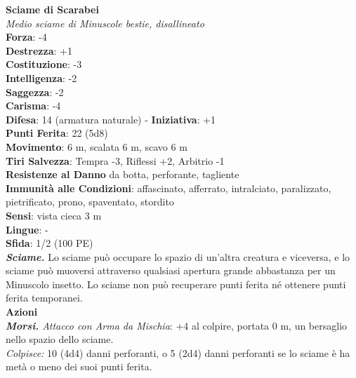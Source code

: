 \begin{multicols}{2}
\medskip\textbf{Sciame di Scarabei}\\
\emph{Medio sciame di Minuscole bestie, disallineato}\\
\textbf{Forza}: -4\\
\textbf{Destrezza}: +1\\
\textbf{Costituzione}: -3\\
\textbf{Intelligenza}: -2\\
\textbf{Saggezza}: -2\\
\textbf{Carisma}: -4\\
\textbf{Difesa}: 14 (armatura naturale) - \textbf{Iniziativa}: +1\\
\textbf{Punti Ferita}: 22 (5d8)\\
\textbf{Movimento}: 6 m, scalata 6 m, scavo 6 m\\
\textbf{Tiri Salvezza}: Tempra -3, Riflessi +2, Arbitrio -1\\
\textbf{Resistenze al Danno} da botta, perforante, tagliente\\
\textbf{Immunità alle Condizioni}: affascinato, afferrato, intralciato, paralizzato, pietrificato, prono, spaventato, stordito\\
\textbf{Sensi}: vista cieca 3 m\\
\textbf{Lingue}: -\\
\textbf{Sfida}: 1/2 (100 PE)\smallskip\\
\emph{\textbf{Sciame.}} Lo sciame può occupare lo spazio di un'altra creatura e viceversa, e lo sciame può muoversi attraverso qualsiasi apertura grande abbastanza per un Minuscolo insetto. Lo sciame non può recuperare punti ferita né ottenere punti ferita temporanei.\\
\smallskip\textbf{Azioni}\\
\emph{\textbf{Morsi.} Attacco con Arma da Mischia}: +4 al colpire, portata 0 m, un bersaglio nello spazio dello sciame.\\
\emph{Colpisce:} 10 (4d4) danni perforanti, o 5 (2d4) danni perforanti se lo sciame è ha metà o meno dei suoi punti ferita.\\


\end{multicols}
